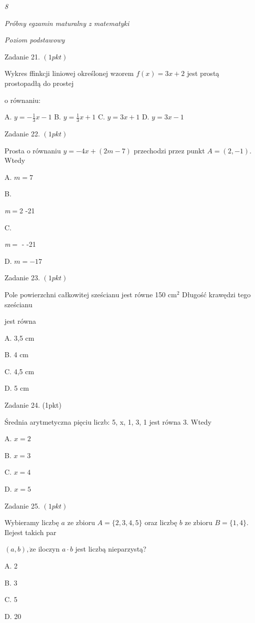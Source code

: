 \documentclass[a4paper,12pt]{article}
\begin{document}
{\it 8}

{\it Próbny egzamin maturalny z matematyki}

{\it Poziom podstawowy}

Zadanie 21. $(1pkt)$

Wykres ffinkcji liniowej określonej wzorem $f(x)=3x+2$ jest prostą prostopadłą do prostej

o równaniu:

A. $y=-\displaystyle \frac{1}{3}x-1$ B. $y=\displaystyle \frac{1}{3}x+1$ C. $y=3x+1$ D. $y=3x-1$

Zadanie 22. $(1pkt)$

Prosta o równaniu $y=-4x+(2m-7)$ przechodzi przez punkt $A=(2,-1)$. Wtedy

A. $m=7$

B.

{\it m}$=$2 -21

C.

{\it m}$=$ - -21

D. $m=-17$

Zadanie 23. $(1pkt)$

Pole powierzchni całkowitej sześcianu jest równe 150 $\mathrm{c}\mathrm{m}^{2}$ Długość krawędzi tego sześcianu

jest równa

A. 3,5 cm

B. 4 cm

C. 4,5 cm

D. 5 cm

Zadanie 24. (1pkt)

Średnia arytmetyczna pięciu liczb: 5, x, 1, 3, 1 jest równa 3. Wtedy

A. $x=2$

B. $x=3$

C. $x=4$

D. $x=5$

Zadanie 25. $(1pkt)$

Wybieramy liczbę $a$ ze zbioru $A=\{2,3,4,5\}$ oraz liczbę $b$ ze zbioru $B=\{1,4\}$. Ilejest takich par

$(a,b), \dot{\mathrm{z}}\mathrm{e}$ iloczyn $a\cdot b$ jest liczbą nieparzystą?

A. 2

B. 3

C. 5

D. 20
\end{document}

